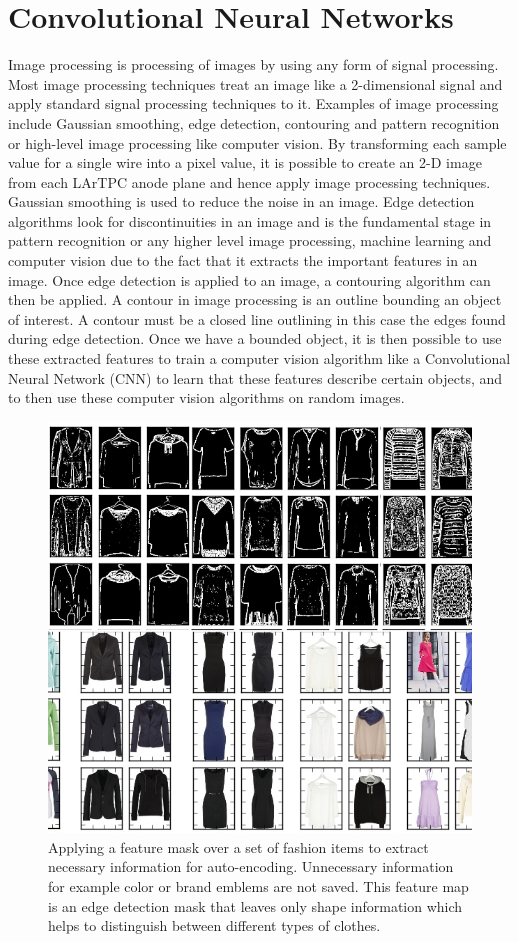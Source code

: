 \chapter{Convolutional Neural Networks}
Image processing is processing of images by using any form of signal processing. Most image processing techniques treat an image like a 2-dimensional signal and apply standard signal processing techniques to it. Examples of image processing include Gaussian smoothing, edge detection, contouring and pattern recognition or high-level image processing like computer vision. By transforming each sample value for a single wire into a pixel value, it is possible to create an 2-D image from each LArTPC anode plane and hence apply image processing techniques. Gaussian smoothing is used to reduce the noise in an image. Edge detection algorithms look for discontinuities in an image and is the fundamental stage in pattern recognition or any higher level image processing, machine learning and computer vision due to the fact that it extracts the important features in an image. Once edge detection is applied to an image, a contouring algorithm can then be applied. A contour in image processing is an outline bounding an object of interest. A contour must be a closed line outlining in this case the edges found during edge detection. Once we have a bounded object, it is then possible to use these extracted features to train a computer vision algorithm like a Convolutional Neural Network (CNN) to learn that these features describe certain objects, and to then use these computer vision algorithms on random images.


\begin{figure}[t!]
\centering
\includegraphics[width=.48\linewidth]{figs/convolution.png}
\caption{Applying a feature mask over a set of fashion items to extract necessary information for auto-encoding. Unnecessary information for example color or brand emblems are not saved. This feature map is an edge detection mask that leaves only shape information which helps to distinguish between different types of clothes.} 
\label{fig:convolution}
\end{figure}


